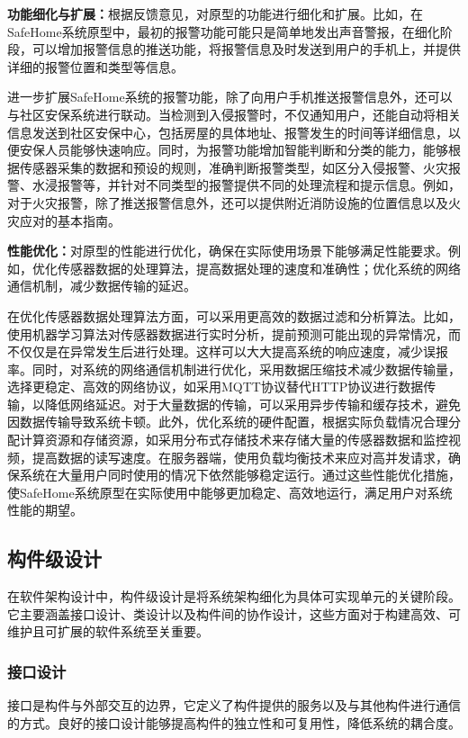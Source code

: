 \textbf{功能细化与扩展：}根据反馈意见，对原型的功能进行细化和扩展。比如，在SafeHome系统原型中，最初的报警功能可能只是简单地发出声音警报，在细化阶段，可以增加报警信息的推送功能，将报警信息及时发送到用户的手机上，并提供详细的报警位置和类型等信息。

进一步扩展SafeHome系统的报警功能，除了向用户手机推送报警信息外，还可以与社区安保系统进行联动。当检测到入侵报警时，不仅通知用户，还能自动将相关信息发送到社区安保中心，包括房屋的具体地址、报警发生的时间等详细信息，以便安保人员能够快速响应。同时，为报警功能增加智能判断和分类的能力，能够根据传感器采集的数据和预设的规则，准确判断报警类型，如区分入侵报警、火灾报警、水浸报警等，并针对不同类型的报警提供不同的处理流程和提示信息。例如，对于火灾报警，除了推送报警信息外，还可以提供附近消防设施的位置信息以及火灾应对的基本指南。

\textbf{性能优化：}对原型的性能进行优化，确保在实际使用场景下能够满足性能要求。例如，优化传感器数据的处理算法，提高数据处理的速度和准确性；优化系统的网络通信机制，减少数据传输的延迟。

在优化传感器数据处理算法方面，可以采用更高效的数据过滤和分析算法。比如，使用机器学习算法对传感器数据进行实时分析，提前预测可能出现的异常情况，而不仅仅是在异常发生后进行处理。这样可以大大提高系统的响应速度，减少误报率。同时，对系统的网络通信机制进行优化，采用数据压缩技术减少数据传输量，选择更稳定、高效的网络协议，如采用MQTT协议替代HTTP协议进行数据传输，以降低网络延迟。对于大量数据的传输，可以采用异步传输和缓存技术，避免因数据传输导致系统卡顿。此外，优化系统的硬件配置，根据实际负载情况合理分配计算资源和存储资源，如采用分布式存储技术来存储大量的传感器数据和监控视频，提高数据的读写速度。在服务器端，使用负载均衡技术来应对高并发请求，确保系统在大量用户同时使用的情况下依然能够稳定运行。通过这些性能优化措施，使SafeHome系统原型在实际使用中能够更加稳定、高效地运行，满足用户对系统性能的期望。

\subsection{构件级设计}

在软件架构设计中，构件级设计是将系统架构细化为具体可实现单元的关键阶段。它主要涵盖接口设计、类设计以及构件间的协作设计，这些方面对于构建高效、可维护且可扩展的软件系统至关重要。

\subsubsection{接口设计}

接口是构件与外部交互的边界，它定义了构件提供的服务以及与其他构件进行通信的方式。良好的接口设计能够提高构件的独立性和可复用性，降低系统的耦合度。

